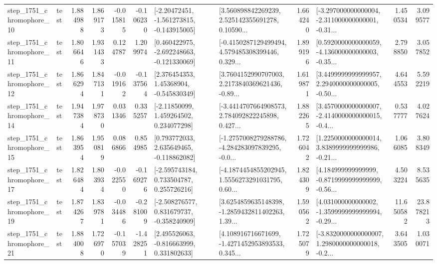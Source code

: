 \begin{tabular}{llrrrrllrlrr}
 step\_1751\_chromophore\_10 &      test &      1.884988 &    1.869173 &     -0.015815 & -0.106230 &   [-2.20472451, -1.561273815, -0.143915005] &  [3.560898842269239, 2.525142355691278, 0.10590... &       1.664240 &  [-3.297000000000004, -2.311000000000001, -0.31... &            1.450534 &          3.099577 \\
 step\_1751\_chromophore\_11 &      test &      1.806646 &    1.931433 &      0.124787 &  1.209974 &   [0.460422975, -2.692248663, -0.121330069] &  [-0.4150287129499494, 4.579485308399446, 0.329... &       1.899196 &  [0.5920000000000059, -4.136000000000003, -0.35... &            2.798850 &          3.057852 \\
 step\_1751\_chromophore\_12 &      test &      1.866294 &    1.847131 &     -0.019162 & -0.137564 &     [2.376454353, 1.45368904, -0.545830349] &  [3.7604152990707003, 2.2173840369621436, -0.89... &       1.619871 &  [3.4499999999999957, 2.2940000000000005, -0.50... &            4.644553 &          5.592219 \\
 step\_1751\_chromophore\_14 &      test &      1.947384 &    1.978730 &      0.031346 &  0.335257 &     [-2.11850099, 1.459264502, 0.234077298] &  [-3.4414707664908573, 2.784092822245898, 0.427... &       1.882265 &  [3.4570000000000007, -2.4140000000000015, -0.4... &            0.537777 &          4.027624 \\
 step\_1751\_chromophore\_15 &      test &      1.863954 &    1.950819 &      0.086866 &  0.854985 &    [0.793772033, 2.635649465, -0.118862082] &  [-1.2757008279288786, -4.284283097839295, -0.0... &       1.726042 &  [1.2250000000000014, 3.8389999999999986, -0.21... &            1.066085 &          3.808349 \\
 step\_1751\_chromophore\_17 &      test &      1.826484 &    1.803934 &     -0.022550 & -0.169276 &    [-2.595743184, 0.733504787, 0.255726216] &  [-4.1874454855202945, 1.5556273291031795, 0.60... &       1.824309 &  [4.184999999999999, -0.8719999999999999, -0.56... &            4.503224 &          8.535635 \\
 step\_1751\_chromophore\_19 &      test &      1.874267 &    1.839781 &     -0.034486 & -0.281009 &   [-2.508276577, 0.831679737, -0.358240909] &  [3.6254859635148398, -1.2859432811402263, 1.39... &       1.590562 &  [4.031000000000002, -1.3599999999999994, -0.29... &           11.650582 &         23.878213 \\
 step\_1751\_chromophore\_21 &      test &      1.884008 &    1.726970 &     -0.157039 & -1.428251 &    [2.495526063, -0.816663999, 0.331802633] &  [4.108916716671699, -1.4271452953893533, 0.345... &       1.725079 &  [-3.8320000000000007, 1.2980000000000018, -0.2... &            3.643505 &          1.030071 \\

\end{tabular}
